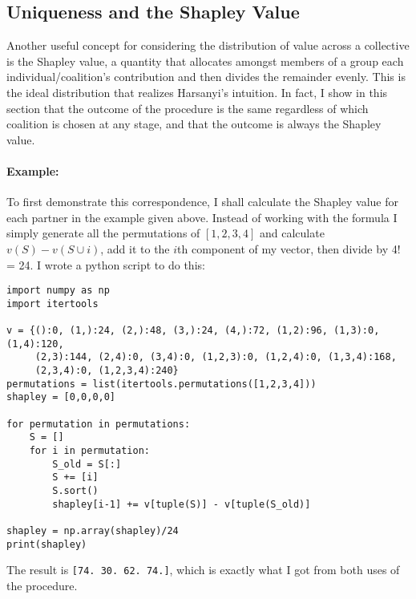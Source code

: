 \documentclass[12pt]{article}
\begin{document}
\subsection*{Uniqueness and the Shapley Value}


Another useful concept for considering the distribution of value across a
collective is the Shapley value, a quantity that allocates amongst members of a
group each individual/coalition's contribution and then divides the remainder
evenly. This is the ideal distribution that realizes Harsanyi's intuition.
In fact, I show in this section that the outcome of the
procedure is the same regardless of which coalition is chosen at any stage,
and that the outcome is always the Shapley value.

\paragraph{Example:}

To first demonstrate this correspondence, I shall calculate the Shapley value
for each partner in the example given above. Instead of working with the formula
I simply generate all the permutations of $[1,2,3,4]$ and calculate $v(S) -
v(S\cup i)$, add it to the $i$th component of my vector, then divide by 4! = 24. 
I wrote a python script to do this:

\begin{verbatim}
import numpy as np
import itertools

v = {():0, (1,):24, (2,):48, (3,):24, (4,):72, (1,2):96, (1,3):0, (1,4):120,
     (2,3):144, (2,4):0, (3,4):0, (1,2,3):0, (1,2,4):0, (1,3,4):168,
     (2,3,4):0, (1,2,3,4):240}
permutations = list(itertools.permutations([1,2,3,4]))
shapley = [0,0,0,0]

for permutation in permutations:
    S = []
    for i in permutation:
        S_old = S[:]
        S += [i]
        S.sort()
        shapley[i-1] += v[tuple(S)] - v[tuple(S_old)]

shapley = np.array(shapley)/24
print(shapley)
\end{verbatim}
The result is \texttt{[74. 30. 62. 74.]}, which is exactly what I got from both
uses of the procedure.
\end{document}
